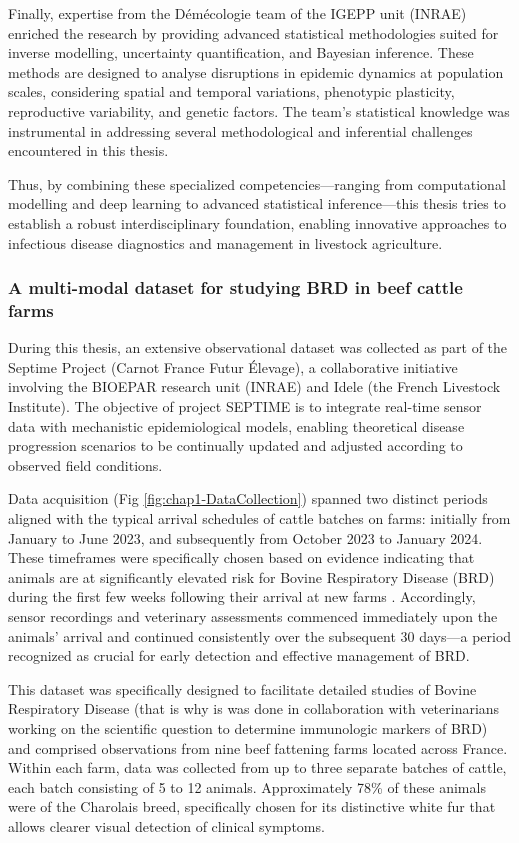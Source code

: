 Finally, expertise from the Démécologie team of the IGEPP unit (INRAE) enriched the research by providing advanced statistical methodologies suited for inverse modelling, uncertainty quantification, and Bayesian inference. These methods are designed to analyse disruptions in epidemic dynamics at population scales, considering spatial and temporal variations, phenotypic plasticity, reproductive variability, and genetic factors. The team's statistical knowledge was instrumental in addressing several methodological and inferential challenges encountered in this thesis.

Thus, by combining these specialized competencies—ranging from computational modelling and deep learning to advanced statistical inference—this thesis tries to establish a robust interdisciplinary foundation, enabling innovative approaches to infectious disease diagnostics and management in livestock agriculture.

\subsubsection*{A multi-modal dataset for studying BRD in beef cattle farms}

During this thesis, an extensive observational dataset was collected as part of the Septime Project (Carnot France Futur Élevage), a collaborative initiative involving the BIOEPAR research unit (INRAE) and Idele (the French Livestock Institute). The objective of project SEPTIME is to integrate real-time sensor data with mechanistic epidemiological models, enabling theoretical disease progression scenarios to be continually updated and adjusted according to observed field conditions.

Data acquisition (Fig \ref{fig:chap1-DataCollection}) spanned two distinct periods aligned with the typical arrival schedules of cattle batches on farms: initially from January to June 2023, and subsequently from October 2023 to January 2024. These timeframes were specifically chosen based on evidence indicating that animals are at significantly elevated risk for Bovine Respiratory Disease (BRD) during the first few weeks following their arrival at new farms \cite{assie_exposure_2009}. Accordingly, sensor recordings and veterinary assessments commenced immediately upon the animals' arrival and continued consistently over the subsequent 30 days—a period recognized as crucial for early detection and effective management of BRD.

This dataset was specifically designed to facilitate detailed studies of Bovine Respiratory Disease (that is why is was done in collaboration with veterinarians working on the scientific question to determine immunologic markers of BRD) and comprised observations from nine beef fattening farms located across France. Within each farm, data was collected from up to three separate batches of cattle, each batch consisting of 5 to 12 animals. Approximately 78\% of these animals were of the Charolais breed, specifically chosen for its distinctive white fur that allows clearer visual detection of clinical symptoms.

